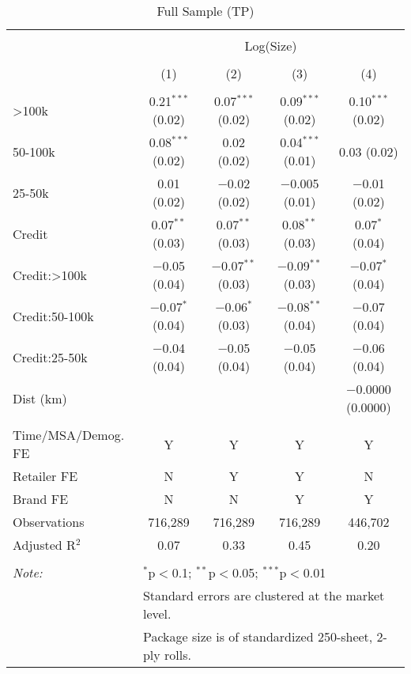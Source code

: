 
\begin{table}[!htbp] \centering 
  \caption{Full Sample (TP)} 
  \label{tab:packageSizeFullLiq} 
\begin{tabular}{@{\extracolsep{5pt}}lcccc} 
\\[-1.8ex]\hline 
\hline \\[-1.8ex] 
 & \multicolumn{4}{c}{Log(Size)} \\ 
\\[-1.8ex] & (1) & (2) & (3) & (4)\\ 
\hline \\[-1.8ex] 
 >100k & 0.21$^{***}$ (0.02) & 0.07$^{***}$ (0.02) & 0.09$^{***}$ (0.02) & 0.10$^{***}$ (0.02) \\ 
  50-100k & 0.08$^{***}$ (0.02) & 0.02 (0.02) & 0.04$^{***}$ (0.01) & 0.03 (0.02) \\ 
  25-50k & 0.01 (0.02) & $-$0.02 (0.02) & $-$0.005 (0.01) & $-$0.01 (0.02) \\ 
  Credit & 0.07$^{**}$ (0.03) & 0.07$^{**}$ (0.03) & 0.08$^{**}$ (0.03) & 0.07$^{*}$ (0.04) \\ 
  Credit:>100k & $-$0.05 (0.04) & $-$0.07$^{**}$ (0.03) & $-$0.09$^{**}$ (0.03) & $-$0.07$^{*}$ (0.04) \\ 
  Credit:50-100k & $-$0.07$^{*}$ (0.04) & $-$0.06$^{*}$ (0.03) & $-$0.08$^{**}$ (0.04) & $-$0.07 (0.04) \\ 
  Credit:25-50k & $-$0.04 (0.04) & $-$0.05 (0.04) & $-$0.05 (0.04) & $-$0.06 (0.04) \\ 
  Dist (km) &  &  &  & $-$0.0000 (0.0000) \\ 
 \hline \\[-1.8ex] 
Time/MSA/Demog. FE & Y & Y & Y & Y \\ 
Retailer FE & N & Y & Y & N \\ 
Brand FE & N & N & Y & Y \\ 
Observations & 716,289 & 716,289 & 716,289 & 446,702 \\ 
Adjusted R$^{2}$ & 0.07 & 0.33 & 0.45 & 0.20 \\ 
\hline 
\hline \\[-1.8ex] 
\textit{Note:}  & \multicolumn{4}{l}{$^{*}$p$<$0.1; $^{**}$p$<$0.05; $^{***}$p$<$0.01} \\ 
 & \multicolumn{4}{l}{Standard errors are clustered at the market level.} \\ 
 & \multicolumn{4}{l}{Package size is of standardized 250-sheet, 2-ply rolls.} \\ 
\end{tabular} 
\end{table} 

